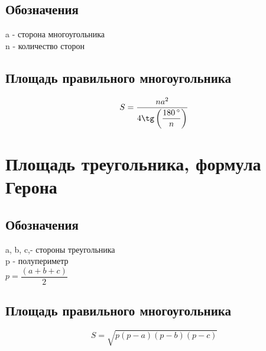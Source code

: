 \documentclass[a4paper,12pt]{article}
\begin{document}
\subsection{Обозначения}

a - сторона многоугольника \\
n - количество сторон

\subsection{Площадь правильного многоугольника}

\[ S = \frac{na^2}{4\tg \left(\dfrac{180\,^{\circ}}{n} \right)} \]

\newpage
\section{Площадь треугольника, формула Герона}

\begin{figure}[h]
\begin{center}
\end{center}
\end{figure}

\subsection{Обозначения}

a, b, c,- стороны треугольника \\[6pt]
p - полупериметр \\[6pt]
$p = \dfrac{( a + b + c)}{2}$

\subsection{Площадь правильного многоугольника}

\[ S = \sqrt{p(p - a)(p - b)(p - c)} \]
\end{document}
